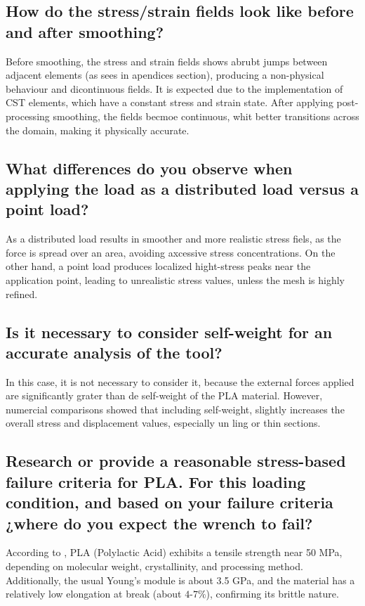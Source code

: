 \subsection{How do the stress/strain fields look like before and after smoothing?}

Before smoothing, the stress and strain fields shows abrubt jumps between adjacent elements (as sees in apendices section), producing a non-physical behaviour and dicontinuous fields. It is expected due to the implementation of CST elements, which have a constant stress and strain state. After applying post-processing smoothing, the fields becmoe continuous, whit better transitions across the domain, making it physically accurate.

\subsection{What differences do you observe when applying the load as a distributed load versus a point load?}

As a distributed load results in smoother and more realistic stress fiels, as the force is spread over an area, avoiding axcessive stress concentrations. 
On the other hand, a point load produces localized hight-stress peaks near the application point, leading to unrealistic stress values, unless the mesh is highly refined.

\subsection{Is it necessary to consider self-weight for an accurate analysis of the tool?}

In this case, it is not necessary to consider it, because the external forces applied are significantly grater than de self-weight of the PLA material. 
However, numercial comparisons showed that including self-weight, slightly increases the overall stress and displacement values, especially un ling or thin sections.

\subsection{Research or provide a reasonable stress-based failure criteria for PLA. For this loading condition, and based on
your failure criteria ¿where do you expect the wrench to fail?}

According to \citet{farah2016}, PLA (Polylactic Acid) exhibits a tensile strength near 50 MPa, depending on molecular weight, crystallinity, and processing method. Additionally, the usual Young's module is about 3.5 GPa, and the material has a relatively low elongation at break (about $4\text{-}7\%$), confirming its brittle nature.

